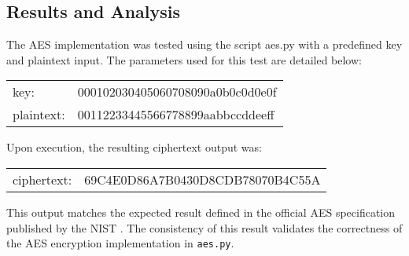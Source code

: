 \subsection{Results and Analysis}

The AES implementation was tested using the script aes.py with a predefined key and plaintext input. 
The parameters used for this test are detailed below:

{\ttfamily
\begin{tabular}{ll}
    key: & 000102030405060708090a0b0c0d0e0f\\
    plaintext: & 00112233445566778899aabbccddeeff
\end{tabular}
}

Upon execution, the resulting ciphertext output was:

{\ttfamily
\begin{tabular}{ll}
    ciphertext: & 69C4E0D86A7B0430D8CDB78070B4C55A
\end{tabular}
}

This output matches the expected result defined in the official \gls{AES} specification published by the \gls{NIST} \cite{NIST_AES}.
The consistency of this result validates the correctness of the \gls{AES} encryption implementation in \texttt{aes.py}.
